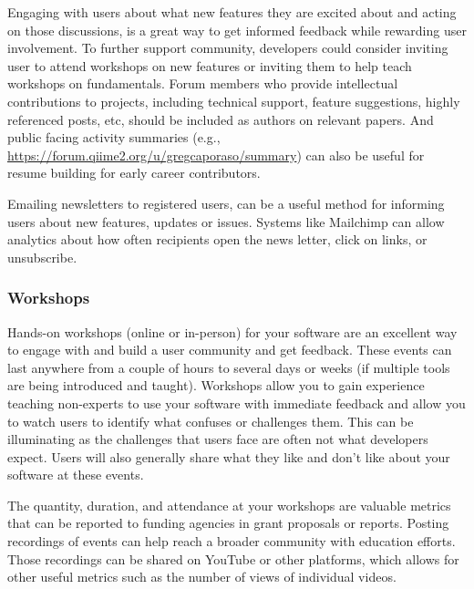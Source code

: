 \documentclass{article}
\begin{document}
Engaging with users about what new features they are excited about and acting on those discussions, is a great way to get informed feedback while rewarding user involvement. To further support community, developers could consider inviting user to attend workshops on new features or inviting them to help teach workshops on fundamentals.  Forum members who provide intellectual contributions to projects, including technical support, feature suggestions, highly referenced posts, etc, should be included as authors on relevant papers. And public facing activity summaries (e.g., \url{https://forum.qiime2.org/u/gregcaporaso/summary}) can also be useful for resume building for early career contributors.

Emailing newsletters to registered users, can be a useful method for informing users about new features, updates or issues. Systems like Mailchimp \cite{mailchimp} can allow analytics about how often recipients open the news letter, click on links, or unsubscribe.

\subsubsection{Workshops}
Hands-on workshops (online\cite{dillon_experiences_2021} or in-person) for your software are an excellent way to engage with and build a user community and get feedback. These events can last anywhere from a couple of hours to several days or weeks (if multiple tools are being introduced and taught). Workshops allow you to gain experience teaching non-experts to use your software with immediate feedback and allow you to watch users to identify what confuses or challenges them. This can be illuminating as the challenges that users face are often not what developers expect. Users will also generally share what they like and don’t like about your software at these events. 

The quantity, duration, and attendance at your workshops are valuable metrics that can be reported to funding agencies in grant proposals or reports. Posting recordings of events can help reach a broader community with education efforts. Those recordings can be shared on YouTube or other platforms, which allows for other useful metrics such as the number of views of individual videos. 
\end{document}
